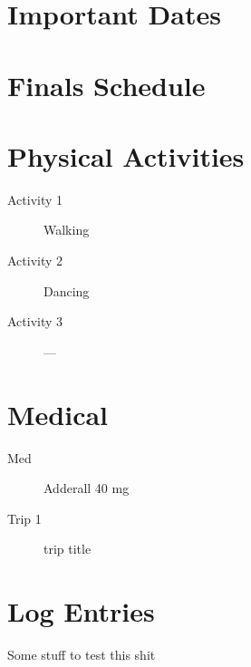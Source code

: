 \documentclass[10pt]{article}
\begin{document}
\pagebreak


\section*{Important Dates}
\label{sec:importantdates}

\section*{Finals Schedule}
\label{sec:finals}

\pagebreak

\section*{Physical Activities}
\label{sec:physical}
\begin{description}
\item [Activity 1] Walking
\item [Activity 2] Dancing
\item [Activity 3] ---
\end{description}

\pagebreak

\section*{Medical}
\label{sec:medical}
\begin{description}
\item [Med] Adderall 40 mg
\end{description}

\pagebreak

\begin{travel}
\label{sec:travel}
\begin{description}
\item [Trip 1] trip title
\end{description}
\end{travel}

\pagebreak

\section*{Log Entries}
\label{sec:logentries}

\pagebreak



Some stuff to test this shit \\


\hrulefill

\newpage
\end{document}
